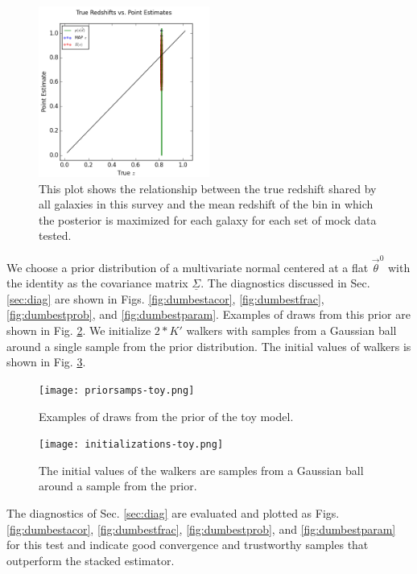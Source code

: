 \documentclass[preprint]{aastex}
\newcommand{\textul}{\underline}
\begin{document}
\begin{figure}
\includegraphics[width=0.5\textwidth]{truevmap-toy.png}
\caption{This plot shows the relationship between the true redshift shared by all galaxies in this survey and the mean redshift of the bin in which the posterior is maximized for each galaxy for each set of mock data tested.}
\label{fig:toycat}
\end{figure}

We choose a prior distribution of a multivariate normal centered at a flat $\vec{\theta}^{0}$ with the identity as the covariance matrix $\textul{\Sigma}$.  The diagnostics discussed in Sec. \ref{sec:diag} are shown in Figs. \ref{fig:dumbestacor}, \ref{fig:dumbestfrac}, \ref{fig:dumbestprob}, and \ref{fig:dumbestparam}.  Examples of draws from this prior are shown in Fig. \ref{fig:fakeprior}.  We initialize $2*K'$ walkers with samples from a Gaussian ball around a single sample from the prior distribution.  The initial values of walkers is shown in Fig. \ref{fig:fakeival}.

\begin{figure}
\texttt{[image: priorsamps-toy.png]}
\caption{Examples of draws from the prior of the toy model.}
\label{fig:fakeprior}
\end{figure}

\begin{figure}
\texttt{[image: initializations-toy.png]}
\caption{The initial values of the walkers are samples from a Gaussian ball around a sample from the prior.}
\label{fig:fakeival}
\end{figure}

The diagnostics of Sec. \ref{sec:diag} are evaluated and plotted as Figs. \ref{fig:dumbestacor}, \ref{fig:dumbestfrac}, \ref{fig:dumbestprob}, and \ref{fig:dumbestparam} for this test and indicate good convergence and trustworthy samples that outperform the stacked estimator.
\end{document}
